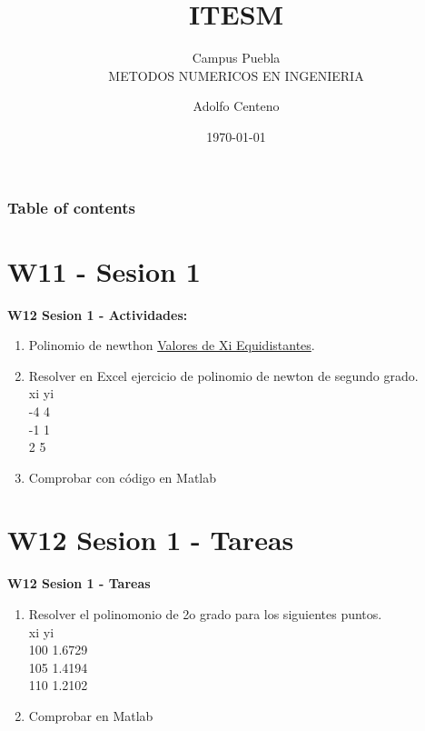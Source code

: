 \documentclass{beamer}
\begin{document}
\title{ITESM}  
\subtitle{Campus Puebla\\METODOS NUMERICOS EN INGENIERIA
}
\author{Adolfo Centeno}
\date{\today} 


\begin{frame}
\titlepage
\end{frame}

\begin{frame}\frametitle{Table of contents}
\tableofcontents
\end{frame} 


\section{W11 - Sesion 1 }

\begin{frame}

\textbf{W12 Sesion 1 - Actividades:}

\begin{enumerate}
\item
	 Polinomio de newthon \href{https://www.youtube.com/watch?v=WgZvz57c5CQ}{Valores de Xi Equidistantes}.

\item
	Resolver en Excel  ejercicio de polinomio de newton de segundo grado. \\
	
	xi	yi \\
-4	4 \\
-1	1 \\
2	5

\item Comprobar con código en Matlab
\end{enumerate} 

\end{frame}


\section{W12 Sesion 1 - Tareas }

\begin{frame}


\textbf{W12 Sesion 1 - Tareas}


\begin{enumerate}
\item

Resolver el polinomonio de 2o grado para los siguientes puntos. \\

xi	yi \\
100	1.6729 \\
105	1.4194 \\
110	1.2102

\item
	Comprobar en Matlab


\end{enumerate} 


\end{frame}
\end{document}
